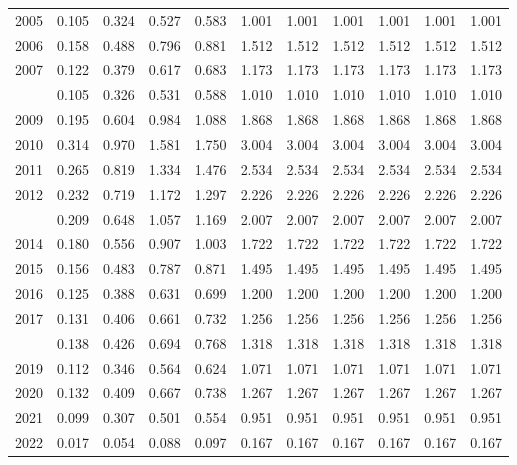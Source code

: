 \documentclass[
]{article}
\begin{document}
\begin{longtable}[t]{lrrrrrrrrrr}
2005 & 0.105 & 0.324 & 0.527 & 0.583 & 1.001 & 1.001 & 1.001 & 1.001 & 1.001 & 1.001\\
2006 & 0.158 & 0.488 & 0.796 & 0.881 & 1.512 & 1.512 & 1.512 & 1.512 & 1.512 & 1.512\\
2007 & 0.122 & 0.379 & 0.617 & 0.683 & 1.173 & 1.173 & 1.173 & 1.173 & 1.173 & 1.173\\
\addlinespace
2008 & 0.105 & 0.326 & 0.531 & 0.588 & 1.010 & 1.010 & 1.010 & 1.010 & 1.010 & 1.010\\
2009 & 0.195 & 0.604 & 0.984 & 1.088 & 1.868 & 1.868 & 1.868 & 1.868 & 1.868 & 1.868\\
2010 & 0.314 & 0.970 & 1.581 & 1.750 & 3.004 & 3.004 & 3.004 & 3.004 & 3.004 & 3.004\\
2011 & 0.265 & 0.819 & 1.334 & 1.476 & 2.534 & 2.534 & 2.534 & 2.534 & 2.534 & 2.534\\
2012 & 0.232 & 0.719 & 1.172 & 1.297 & 2.226 & 2.226 & 2.226 & 2.226 & 2.226 & 2.226\\
\addlinespace
2013 & 0.209 & 0.648 & 1.057 & 1.169 & 2.007 & 2.007 & 2.007 & 2.007 & 2.007 & 2.007\\
2014 & 0.180 & 0.556 & 0.907 & 1.003 & 1.722 & 1.722 & 1.722 & 1.722 & 1.722 & 1.722\\
2015 & 0.156 & 0.483 & 0.787 & 0.871 & 1.495 & 1.495 & 1.495 & 1.495 & 1.495 & 1.495\\
2016 & 0.125 & 0.388 & 0.631 & 0.699 & 1.200 & 1.200 & 1.200 & 1.200 & 1.200 & 1.200\\
2017 & 0.131 & 0.406 & 0.661 & 0.732 & 1.256 & 1.256 & 1.256 & 1.256 & 1.256 & 1.256\\
\addlinespace
2018 & 0.138 & 0.426 & 0.694 & 0.768 & 1.318 & 1.318 & 1.318 & 1.318 & 1.318 & 1.318\\
2019 & 0.112 & 0.346 & 0.564 & 0.624 & 1.071 & 1.071 & 1.071 & 1.071 & 1.071 & 1.071\\
2020 & 0.132 & 0.409 & 0.667 & 0.738 & 1.267 & 1.267 & 1.267 & 1.267 & 1.267 & 1.267\\
2021 & 0.099 & 0.307 & 0.501 & 0.554 & 0.951 & 0.951 & 0.951 & 0.951 & 0.951 & 0.951\\
2022 & 0.017 & 0.054 & 0.088 & 0.097 & 0.167 & 0.167 & 0.167 & 0.167 & 0.167 & 0.167\\*
\end{longtable}
\end{document}
